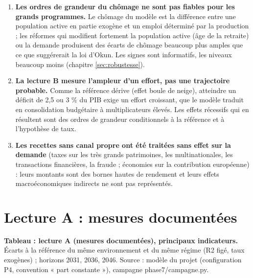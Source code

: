 \documentclass[
  11pt,
  11pt,
  a4paper,
  openany]{book}
\providecommand{\tightlist}{%
  \setlength{\itemsep}{0pt}\setlength{\parskip}{0pt}}
\begin{document}
\begin{enumerate}
\def\labelenumi{\arabic{enumi}.}
\tightlist
\item
  \textbf{Les ordres de grandeur du chômage ne sont pas fiables pour les
  grands programmes.} Le chômage du modèle est la différence entre une
  population active en partie exogène et un emploi déterminé par la
  production ; les réformes qui modifient fortement la population active
  (âge de la retraite) ou la demande produisent des écarts de chômage
  beaucoup plus amples que ce que suggérerait la loi d'Okun. Les signes
  sont informatifs, les niveaux beaucoup moins (chapitre
  \ref{sec:robustesse}).
\item
  \textbf{La lecture B mesure l'ampleur d'un effort, pas une trajectoire
  probable.} Comme la référence dérive (effet boule de neige), atteindre
  un déficit de 2,5 ou 3 \% du PIB exige un effort croissant, que le
  modèle traduit en consolidation budgétaire à multiplicateurs élevés.
  Les effets récessifs qui en résultent sont des ordres de grandeur
  conditionnels à la référence et à l'hypothèse de taux.
\item
  \textbf{Les recettes sans canal propre ont été traitées sans effet sur
  la demande} (taxes sur les très grands patrimoines, les
  multinationales, les transactions financières, la fraude ; économies
  sur la contribution européenne) : leurs montants sont des bornes
  hautes de rendement et leurs effets macroéconomiques indirects ne sont
  pas représentés.
\end{enumerate}

\hypertarget{sec:lecture-a}{%
\section{Lecture A : mesures documentées}\label{sec:lecture-a}}

\textbf{Tableau : lecture A (mesures documentées), principaux
indicateurs.} Écarts à la référence du même environnement et du même
régime (R2 figé, taux exogènes) ; horizons 2031, 2036, 2046. Source :
modèle du projet (configuration P4, convention « part constante »),
campagne phase7/campagne.py.
\end{document}
